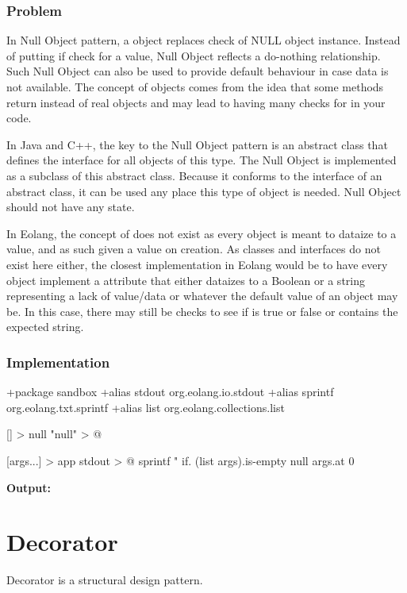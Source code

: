 \documentclass[12pt]{book}
\begin{document}
{{\subsubsection{Problem}
In Null Object pattern, a  object replaces check of NULL object instance. Instead of putting if check for a  value, Null Object reflects a do-nothing relationship. Such Null Object can also be used to provide default behaviour in case data is not available. The concept of  objects comes from the idea that some methods return  instead of real objects and may lead to having many checks for  in your code.

In Java and C++, the key to the Null Object pattern is an abstract class that defines the interface for all objects of this type. The Null Object is implemented as a subclass of this abstract class. Because it conforms to the interface of an abstract class, it can be used any place this type of object is needed. Null Object should not have any state.

In Eolang, the concept of  does not exist as every object is meant to dataize to a value, and as such given a value on creation. As classes and interfaces do not exist here either, the closest implementation in Eolang would be to have every object implement a  attribute that either dataizes to a Boolean or a string representing a lack of value/data or whatever the default value of an object may be. In this case, there may still be checks to see if  is true or false or contains the expected string.

\subsubsection{Implementation}
\begin{ffcode}
+package sandbox
+alias stdout org.eolang.io.stdout
+alias sprintf org.eolang.txt.sprintf
+alias list org.eolang.collections.list

[] > null
  "null" > @

[args...] > app
  stdout > @
    sprintf
      "%
      if.
        (list args).is-empty
        null
        args.at 0
\end{ffcode}
\textbf{Output:}

\section{Decorator}
Decorator is a structural design pattern.

}}
\end{document}
